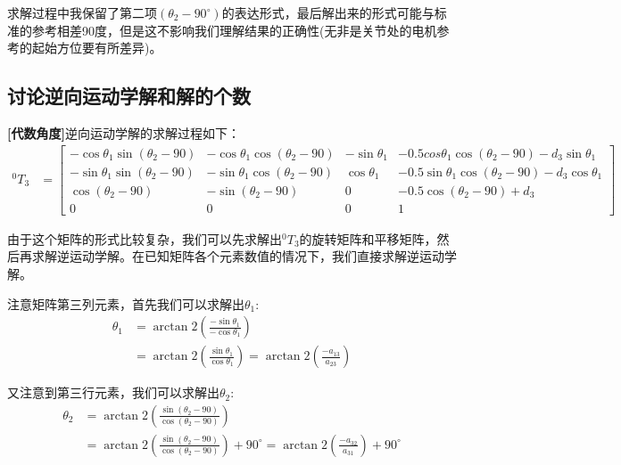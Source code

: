 \documentclass{ctexart}
\begin{document}
求解过程中我保留了第二项$(\theta_2-90^\circ)$的表达形式，最后解出来的形式可能与标准的参考相差90度，但是这不影响我们理解结果的正确性(无非是关节处的电机参考的起始方位要有所差异)。

\subsection{讨论逆向运动学解和解的个数}
\textbf{[代数角度]}逆向运动学解的求解过程如下：
\begin{equation}
	\begin{aligned}
		^0T_3&=\begin{bmatrix}
			-\cos\theta_1\sin(\theta_2-90) & -\cos\theta_1\cos(\theta_2-90) & -\sin\theta_1 & -0.5cos\theta_1\cos(\theta_2-90)-d_3\sin\theta_1 \\
			-\sin\theta_1\sin(\theta_2-90) & -\sin\theta_1\cos(\theta_2-90) & \cos\theta_1 & -0.5\sin\theta_1\cos(\theta_2-90)-d_3\cos\theta_1 \\
			\cos(\theta_2-90) & -\sin(\theta_2-90) & 0 & -0.5\cos(\theta_2-90)+d_3 \\
			0 & 0 & 0 & 1
		\end{bmatrix}
	\end{aligned}
\end{equation}

由于这个矩阵的形式比较复杂，我们可以先求解出$^0T_3$的旋转矩阵和平移矩阵，然后再求解逆运动学解。在已知矩阵各个元素数值的情况下，我们直接求解逆运动学解。

注意矩阵第三列元素，首先我们可以求解出$\theta_1$:
\begin{equation}
	\begin{aligned}
		\theta_1&=\arctan2\left(\frac{-\sin\theta_1}{-\cos\theta_1}\right)\\
		&=\arctan2\left(\frac{\sin\theta_1}{\cos\theta_1}\right)=\arctan2\left(\frac{-a_{13}}{a_{23}}\right)
	\end{aligned}
\end{equation}

又注意到第三行元素，我们可以求解出$\theta_2$:
\begin{equation}
	\begin{aligned}
		\theta_2&=\arctan2\left(\frac{\sin(\theta_2-90)}{\cos(\theta_2-90)}\right)\\
		&=\arctan2\left(\frac{\sin(\theta_2-90)}{\cos(\theta_2-90)}\right)+90^\circ=\arctan2\left(\frac{-a_{32}}{a_{31}}\right)+90^\circ
	\end{aligned}
\end{equation}
\end{document}
